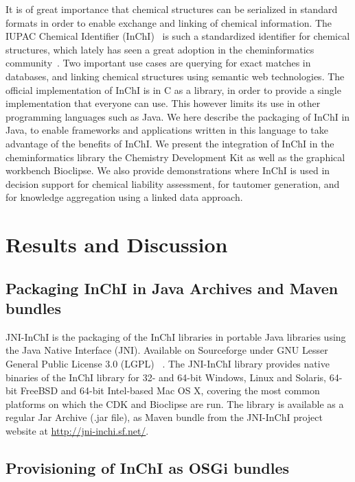 \documentclass[10pt]{bmc_article}
\newenvironment{bmcformat}{\fussy\setboolean{publ}{true}}{\fussy}
\begin{document}
\begin{bmcformat}
It is of great importance that chemical structures can be serialized in standard formats in order to enable exchange and linking of chemical information. The IUPAC Chemical Identifier (InChI)~\cite{Stein2003} is such a standardized identifier for chemical structures, which lately has seen a great adoption in the cheminformatics community~\cite{OBoyle:2011fk}. Two important use cases are querying for exact matches in databases, and linking chemical structures using semantic web technologies. The official implementation of InChI is in C as a library, in order to provide a single implementation that everyone can use. This however limits its use in other programming languages such as Java. We here describe the packaging of InChI in Java, to enable frameworks and applications written in this language to take advantage of the benefits of InChI. We present the integration of InChI in the cheminformatics library the Chemistry Development Kit as well as the graphical workbench Bioclipse. We also provide demonstrations where InChI is used in decision support for chemical liability assessment, for tautomer generation, and for knowledge aggregation using a linked data approach.
 




\section*{Results and Discussion}

\subsection*{Packaging InChI in Java Archives and Maven bundles}

JNI-InChI is the packaging of the InChI libraries in portable Java libraries using the Java Native Interface (JNI).
Available on Sourceforge under GNU Lesser General Public License 3.0 (LGPL) ~\cite{JNIINCHIURL}.
The JNI-InChI library provides native binaries of the InChI library for 32- and 64-bit Windows, Linux and Solaris,
64-bit FreeBSD and 64-bit Intel-based Mac OS X, covering the most common platforms on which the CDK and Bioclipse are run.
The library is available as a regular Jar Archive (.jar file), as Maven bundle from the JNI-InChI project website
at \url{http://jni-inchi.sf.net/}.

\subsection*{Provisioning of InChI as OSGi bundles}


\end{bmcformat}
\end{document}
